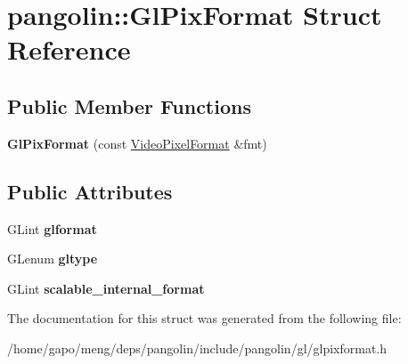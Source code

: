 \hypertarget{structpangolin_1_1_gl_pix_format}{}\section{pangolin\+:\+:Gl\+Pix\+Format Struct Reference}
\label{structpangolin_1_1_gl_pix_format}
\subsection*{Public Member Functions}
\begin{DoxyCompactItemize}
\item 
{\bfseries Gl\+Pix\+Format} (const \hyperlink{structpangolin_1_1_video_pixel_format}{Video\+Pixel\+Format} \&fmt)\hypertarget{structpangolin_1_1_gl_pix_format_a18b572f252f43d1a3abc6a78301acb93}{}\label{structpangolin_1_1_gl_pix_format_a18b572f252f43d1a3abc6a78301acb93}

\end{DoxyCompactItemize}
\subsection*{Public Attributes}
\begin{DoxyCompactItemize}
\item 
G\+Lint {\bfseries glformat}\hypertarget{structpangolin_1_1_gl_pix_format_ab7a0b69701b7807210c0f331f61e52e3}{}\label{structpangolin_1_1_gl_pix_format_ab7a0b69701b7807210c0f331f61e52e3}

\item 
G\+Lenum {\bfseries gltype}\hypertarget{structpangolin_1_1_gl_pix_format_a245731c358a482adf0d30a0d4c0ed52e}{}\label{structpangolin_1_1_gl_pix_format_a245731c358a482adf0d30a0d4c0ed52e}

\item 
G\+Lint {\bfseries scalable\+\_\+internal\+\_\+format}\hypertarget{structpangolin_1_1_gl_pix_format_a39268f1eeffed0cd2127dab810aac361}{}\label{structpangolin_1_1_gl_pix_format_a39268f1eeffed0cd2127dab810aac361}

\end{DoxyCompactItemize}


The documentation for this struct was generated from the following file\+:\begin{DoxyCompactItemize}
\item 
/home/gapo/meng/deps/pangolin/include/pangolin/gl/glpixformat.\+h\end{DoxyCompactItemize}
